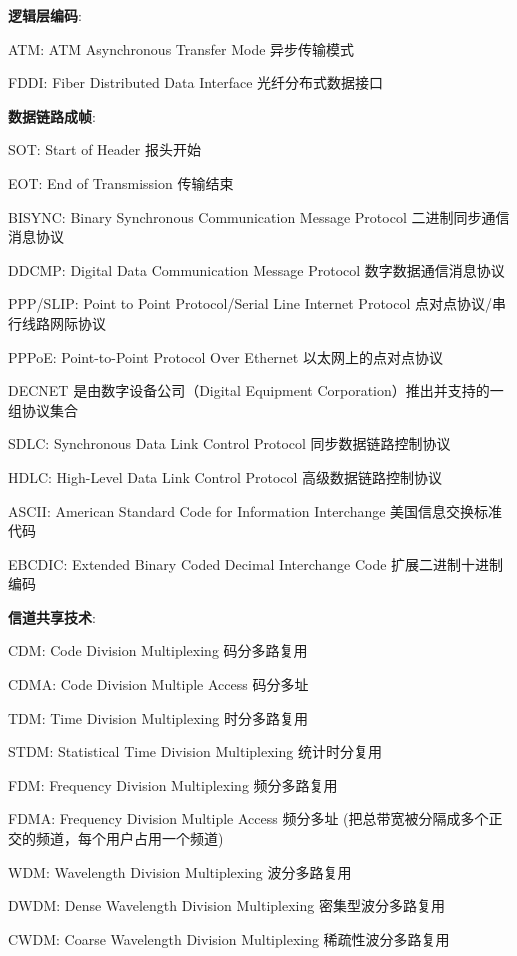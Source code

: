\documentclass[UTF8,cs4size]{ctexart}
\begin{document}
\textbf{逻辑层编码}:
\begin{compactitem}
  \item ATM: ATM Asynchronous Transfer Mode 异步传输模式
  \item FDDI: Fiber Distributed Data Interface 光纤分布式数据接口 
\end{compactitem}

\textbf{数据链路成帧}:
\begin{compactitem}
  \item SOT: Start of Header 报头开始
  \item EOT: End of Transmission 传输结束
  \item BISYNC: Binary Synchronous Communication Message Protocol 二进制同步通信消息协议
  \item DDCMP: Digital Data Communication Message Protocol 数字数据通信消息协议
  \item PPP/SLIP: Point to Point Protocol/Serial Line Internet Protocol  点对点协议/串行线路网际协议
  \item PPPoE: Point-to-Point Protocol Over Ethernet 以太网上的点对点协议
  \item DECNET 是由数字设备公司（Digital Equipment Corporation）推出并支持的一组协议集合
  \item SDLC: Synchronous Data Link Control Protocol 同步数据链路控制协议
  \item HDLC: High-Level Data Link Control Protocol 高级数据链路控制协议
  \item ASCII: American Standard Code for Information Interchange 美国信息交换标准代码
  \item EBCDIC: Extended Binary Coded Decimal Interchange Code 扩展二进制十进制编码
\end{compactitem}

\textbf{信道共享技术}:
\begin{compactitem}
  \item CDM: Code Division Multiplexing 码分多路复用
  \item CDMA: Code Division Multiple Access 码分多址
  \item TDM: Time Division Multiplexing 时分多路复用
  \item STDM: Statistical Time Division Multiplexing 统计时分复用
  \item FDM: Frequency Division Multiplexing 频分多路复用
  \item FDMA: Frequency Division Multiple Access 频分多址 (把总带宽被分隔成多个正交的频道，每个用户占用一个频道)
  \item WDM: Wavelength Division Multiplexing 波分多路复用
  \item DWDM: Dense Wavelength Division Multiplexing 密集型波分多路复用
  \item CWDM: Coarse Wavelength Division Multiplexing 稀疏性波分多路复用
\end{compactitem}
\end{document}
